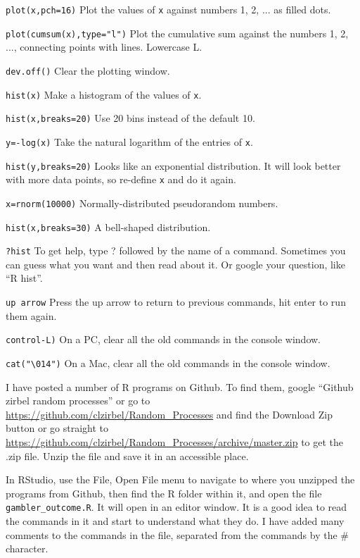 \item {\tt plot(x,pch=16)} \hfill Plot the values of {\tt x} against numbers 1, 2, ... as filled dots.
\item {\tt plot(cumsum(x),type="l")} \hfill Plot the cumulative sum against the numbers 1, 2, ..., \new connecting points with lines. Lowercase L.
\item {\tt dev.off()} \hfill Clear the plotting window.
\item {\tt hist(x)} \hfill Make a histogram of the values of {\tt x}.
\item {\tt hist(x,breaks=20)} \hfill Use 20 bins instead of the default 10.
\item {\tt y=-log(x)} \hfill Take the natural logarithm of the entries of
{\tt x}.
\item {\tt hist(y,breaks=20)} \hfill Looks like an exponential distribution.  It will look better \new with more data points, so re-define {\tt x} and do it again.
\item {\tt x=rnorm(10000)} \hfill Normally-distributed pseudorandom numbers.
\item {\tt hist(x,breaks=30)} \hfill A bell-shaped distribution. 
\item {\tt ?hist} \hfill To get help, type ? followed by the name of a command.  Sometimes \new you can guess what you want and then read about it.  Or google your question, like ``R hist''.

\item {\tt up arrow} \hfill Press the up arrow to return to previous commands, hit enter to run them again.
\item {\tt control-L)} \hfill On a PC, clear all the old commands in the console window.
\item {\tt cat("\textbackslash 014")} \hfill On a Mac, clear all the old commands in the console window.

\item I have posted a number of R programs on Github.  To find them, google ``Github zirbel random processes'' or go to \url{https://github.com/clzirbel/Random\_Processes} and find the Download Zip button or go straight to \url{https://github.com/clzirbel/Random\_Processes/archive/master.zip} to get the .zip file.
Unzip the file and save it in an accessible place.

\item In RStudio, use the File, Open File menu to navigate to where you unzipped the programs from Github, then find the R folder within it, and open the file {\tt gambler\_outcome.R}.  It will open in an editor window.  It is a good idea to read the commands in it and start to understand what they do.  I have added many comments to the commands in the file, separated from the commands by the \# character.

